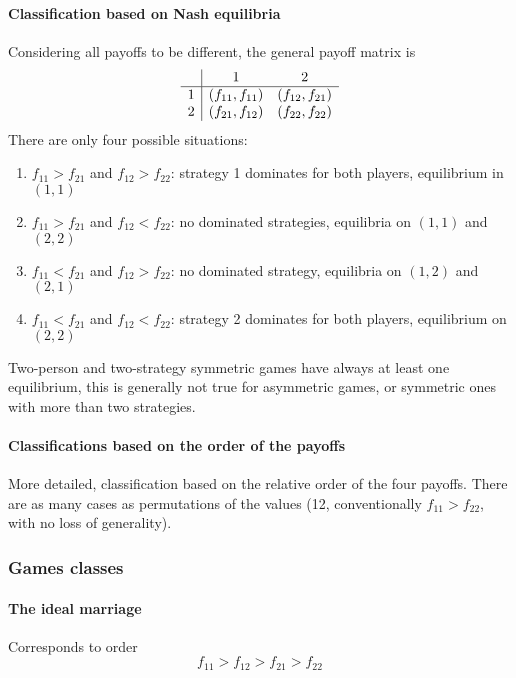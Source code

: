 \paragraph{Classification based on Nash equilibria} Considering all payoffs to be different, the general payoff matrix is
$$ \begin{array}{c | c c}
	& 1 & 2  \\
	\hline
	1 & (f_{11}, f_{11}) & (f_{12}, f_{21}) \\
	2 & (f_{21}, f_{12}) & (f_{22}, f_{22}) \\
\end{array}$$
There are only four possible situations: 
\begin{enumerate}
	\item $f_{11} > f_{21}$ and $f_{12} > f_{22}$: strategy 1 dominates for both players, equilibrium in $(1,1)$
	
	\item $f_{11} > f_{21}$ and $f_{12} < f_{22}$: no dominated strategies, equilibria on $(1,1)$ and $(2,2)$
	
	\item $f_{11} < f_{21}$ and $f_{12} > f_{22}$: no dominated strategy, equilibria on $(1,2)$ and $(2,1)$
	
	\item $f_{11} < f_{21}$ and $f_{12} < f_{22}$: strategy 2 dominates for both players, equilibrium on $(2,2)$
\end{enumerate}

Two-person and two-strategy symmetric games have always at least one equilibrium, this is generally not true for asymmetric games, or symmetric ones with more than two strategies.

\paragraph{Classifications based on the order of the payoffs} More detailed, classification based on the relative order of the four payoffs. There are as many cases as permutations of the values (12, conventionally $f_{11} > f_{22}$, with no loss of generality).

\subsubsection{Games classes}

\paragraph{The ideal marriage} Corresponds to order
$$ f_{11} > f_{12} > f_{21} > f_{22} $$

